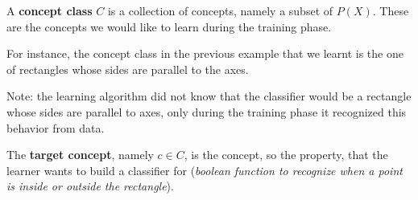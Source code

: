 \begin{definition}[title = Concept class]
    A \textbf{concept class} $C$ is a collection of concepts, namely a subset of $P(X)$. These are the concepts we would like to learn during the training 
    phase. \vspace{7pt}

    For instance, the concept class in the previous example that we learnt is the one of rectangles whose sides are parallel to the axes. \vspace{7pt}

    Note: the learning algorithm did not know that the classifier would be a rectangle whose sides are parallel to axes, only during the training phase 
    it recognized this behavior from data. \vspace{7pt}

    The \textbf{target concept}, namely $c \in C$, is the concept, so the property, that the learner wants to build a classifier for (\textit{boolean function to 
    recognize when a point is inside or outside the rectangle}).
\end{definition}